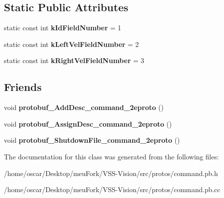\subsection*{Static Public Attributes}
\begin{DoxyCompactItemize}
\item 
\hypertarget{classvss__command_1_1Robot__Command_a72d358bc06840eb9b5835ad46cee4620}{static const int {\bfseries k\-Id\-Field\-Number} = 1}\label{classvss__command_1_1Robot__Command_a72d358bc06840eb9b5835ad46cee4620}

\item 
\hypertarget{classvss__command_1_1Robot__Command_a834467a27672508216892c745d78bad4}{static const int {\bfseries k\-Left\-Vel\-Field\-Number} = 2}\label{classvss__command_1_1Robot__Command_a834467a27672508216892c745d78bad4}

\item 
\hypertarget{classvss__command_1_1Robot__Command_adb4e9f137218f7bf68ba93029e028e40}{static const int {\bfseries k\-Right\-Vel\-Field\-Number} = 3}\label{classvss__command_1_1Robot__Command_adb4e9f137218f7bf68ba93029e028e40}

\end{DoxyCompactItemize}
\subsection*{Friends}
\begin{DoxyCompactItemize}
\item 
\hypertarget{classvss__command_1_1Robot__Command_a4825d92f856fcb4b02c67b601c433796}{void {\bfseries protobuf\-\_\-\-Add\-Desc\-\_\-command\-\_\-2eproto} ()}\label{classvss__command_1_1Robot__Command_a4825d92f856fcb4b02c67b601c433796}

\item 
\hypertarget{classvss__command_1_1Robot__Command_a4c6fb97c25079d49daf010087d869100}{void {\bfseries protobuf\-\_\-\-Assign\-Desc\-\_\-command\-\_\-2eproto} ()}\label{classvss__command_1_1Robot__Command_a4c6fb97c25079d49daf010087d869100}

\item 
\hypertarget{classvss__command_1_1Robot__Command_a4cf10633ad46690f5eec6bdbbcf62de0}{void {\bfseries protobuf\-\_\-\-Shutdown\-File\-\_\-command\-\_\-2eproto} ()}\label{classvss__command_1_1Robot__Command_a4cf10633ad46690f5eec6bdbbcf62de0}

\end{DoxyCompactItemize}


The documentation for this class was generated from the following files\-:\begin{DoxyCompactItemize}
\item 
/home/oscar/\-Desktop/meu\-Fork/\-V\-S\-S-\/\-Vision/src/protos/command.\-pb.\-h\item 
/home/oscar/\-Desktop/meu\-Fork/\-V\-S\-S-\/\-Vision/src/protos/command.\-pb.\-cc\end{DoxyCompactItemize}
